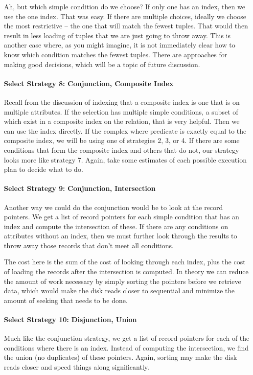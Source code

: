 Ah, but which simple condition do we choose? If only one has an index, then we use the one index. That was easy. If there are multiple choices, ideally we choose the most restrictive -- the one that will match the fewest tuples. That would then result in less loading of tuples that we are just going to throw away. This is another case where, as you might imagine, it is not immediately clear how to know which condition matches the fewest tuples. There are approaches for making good decisions, which will be a topic of future discussion. 

\paragraph{Select Strategy 8: Conjunction, Composite Index}
Recall from the discussion of indexing that a composite index is one that is on multiple attributes. If the selection has multiple simple conditions, a subset of which exist in a composite index on the relation, that is very helpful. Then we can use the index directly. If the complex where predicate is exactly equal to the composite index, we will be using one of strategies 2, 3, or 4. If there are some conditions that form the composite index and others that do not, our strategy looks more like strategy 7. Again, take some estimates of each possible execution plan to decide what to do.

\paragraph{Select Strategy 9: Conjunction, Intersection}
Another way we could do the conjunction would be to look at the record pointers. We get a list of record pointers for each simple condition that has an index and compute the intersection of these. If there are any conditions on attributes without an index, then we must further look through the results to throw away those records that don't meet all conditions.

The cost here is the sum of the cost of looking through each index, plus the cost of loading the records after the intersection is computed. In theory we can reduce the amount of work necessary by simply sorting the pointers before we retrieve data, which would make the disk reads closer to sequential and minimize the amount of seeking that needs to be done.

\paragraph{Select Strategy 10: Disjunction, Union}
Much like the conjunction strategy, we get a list of record pointers for each of the conditions where there is an index. Instead of computing the intersection, we find the union (no duplicates) of these pointers. Again, sorting may make the disk reads closer and speed things along significantly.

